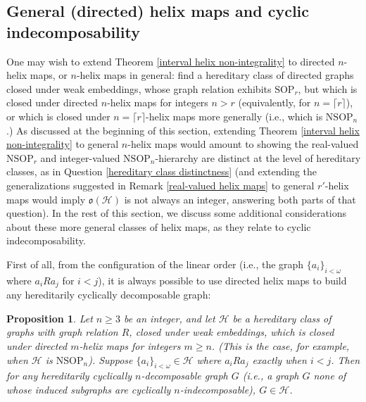 \documentclass{amsart}
\newtheorem{prop}[theorem]{Proposition}
\theoremstyle{definition}
\theoremstyle{remark}
\numberwithin{equation}{section}
\begin{document}
\subsection{General (directed) helix maps and cyclic indecomposability} 

One may wish to extend Theorem \ref{interval helix non-integrality} to directed $n$-helix maps, or $n$-helix maps in general: find a hereditary class of directed graphs closed under weak embeddings, whose graph relation exhibits $\mathrm{SOP}_{r}$, but which is closed under directed $n$-helix maps for integers $n > r$ (equivalently, for $n = \lceil r \rceil$), or which is closed under $n= \lceil r \rceil$-helix maps more generally (i.e., which is $\mathrm{NSOP}_{n}$.) As discussed at the beginning of this section, extending Theorem \ref{interval helix non-integrality} to general $n$-helix maps would amount to showing the real-valued $\mathrm{NSOP}_{r}$ and integer-valued $\mathrm{NSOP}_{n}$-hierarchy are distinct at the level of hereditary classes, as in Question \ref{hereditary class distinctness} (and extending the generalizations suggested in Remark \ref{real-valued helix maps} to general $r'$-helix maps would imply $\mathfrak{o}(\mathcal{H})$ is not always an integer, answering both parts of that question). In the rest of this section, we discuss some additional considerations about these more general classes of helix maps, as they relate to cyclic indecomposability.

First of all, from the configuration of the linear order (i.e., the graph $\{a_{i}\}_{i < \omega}$ where $a_{i} R a_{j}$ for $i < j$), it is always possible to use directed helix maps to build any hereditarily cyclically decomposable graph:

\begin{prop}\label{directed helix maps build hereditarily cylically decompsable graphs}
    Let $n \geq 3$ be an integer, and let $\mathcal{H}$ be a hereditary class of graphs with graph relation $R$, closed under weak embeddings, which is closed under directed $m$-helix maps for integers $m \geq n$. (This is the case, for example, when $\mathcal{H}$ is $\mathrm{NSOP}_{n}$). Suppose $\{a_{i}\}_{i < \omega} \in \mathcal{H}$ where $a_{i} R a_{j}$ exactly when $i < j$. Then for any hereditarily cyclically $n$-decomposable graph $G$ (i.e., a graph $G$ none of whose induced subgraphs are cyclically $n$-indecomposable), $G \in \mathcal{H}$.
\end{prop}
\end{document}
